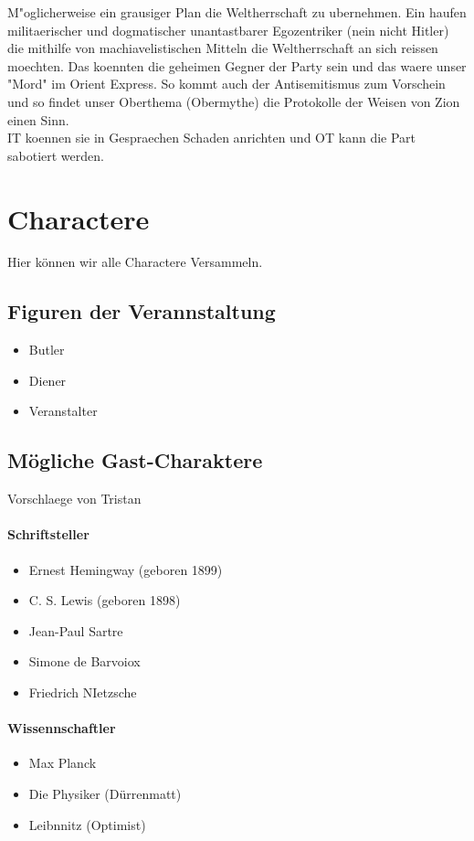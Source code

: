 \documentclass[12pt, a4paper, openany]{report}
\begin{document}
M"oglicherweise ein grausiger Plan die Weltherrschaft zu ubernehmen. 
Ein haufen militaerischer und dogmatischer unantastbarer Egozentriker (nein nicht Hitler) die mithilfe von machiavelistischen Mitteln die Weltherrschaft an sich reissen moechten. 
Das koennten die geheimen Gegner der Party sein und das waere unser "Mord" im Orient Express. 
So kommt auch der Antisemitismus zum Vorschein und so findet unser Oberthema (Obermythe) die Protokolle der Weisen von Zion einen Sinn.\\
IT koennen sie in Gespraechen Schaden anrichten und OT kann die Part sabotiert werden. 


\chapter{Charactere}
Hier können wir alle Charactere Versammeln.

\section{Figuren der Verannstaltung}
\begin{itemize}
    \item Butler
    \item Diener
    \item Veranstalter
\end{itemize}

\section{Mögliche Gast-Charaktere}
Vorschlaege von Tristan
\subsubsection{Schriftsteller}
\begin{itemize}
    \item Ernest Hemingway (geboren 1899)
    \item C. S. Lewis (geboren 1898)
    \item Jean-Paul Sartre
    \item Simone de Barvoiox
    \item Friedrich NIetzsche
\end{itemize}

\subsubsection{Wissennschaftler}
\begin{itemize}
	\item Max Planck
	\item Die Physiker (Dürrenmatt)
	\item Leibnnitz (Optimist)
\end{itemize}
\end{document}
